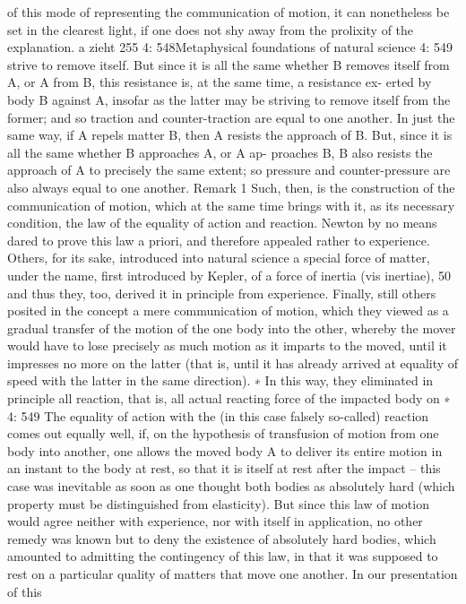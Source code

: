 of this mode of representing the communication of motion, it can nonetheless
be set in the clearest light, if one does not shy away from the prolixity of the
explanation.
a
zieht
255
4: 548Metaphysical foundations of natural science
4: 549
strive to remove itself. But since it is all the same whether B removes itself
from A, or A from B, this resistance is, at the same time, a resistance ex-
erted by body B against A, insofar as the latter may be striving to remove
itself from the former; and so traction and counter-traction are equal to
one another. In just the same way, if A repels matter B, then A resists the
approach of B. But, since it is all the same whether B approaches A, or A ap-
proaches B, B also resists the approach of A to precisely the same extent;
so pressure and counter-pressure are also always equal to one another.
Remark 1
Such, then, is the construction of the communication of motion, which
at the same time brings with it, as its necessary condition, the law of
the equality of action and reaction. Newton by no means dared to prove
this law a priori, and therefore appealed rather to experience. Others, for
its sake, introduced into natural science a special force of matter, under
the name, ﬁrst introduced by Kepler, of a force of inertia (vis inertiae), 50
and thus they, too, derived it in principle from experience. Finally, still
others posited in the concept a mere communication of motion, which
they viewed as a gradual transfer of the motion of the one body into
the other, whereby the mover would have to lose precisely as much
motion as it imparts to the moved, until it impresses no more on the
latter (that is, until it has already arrived at equality of speed with the
latter in the same direction). ∗ In this way, they eliminated in principle
all reaction, that is, all actual reacting force of the impacted body on
∗
4: 549
The equality of action with the (in this case falsely so-called) reaction comes out
equally well, if, on the hypothesis of transfusion of motion from one body into
another, one allows the moved body A to deliver its entire motion in an instant
to the body at rest, so that it is itself at rest after the impact – this case was
inevitable as soon as one thought both bodies as absolutely hard (which property
must be distinguished from elasticity). But since this law of motion would
agree neither with experience, nor with itself in application, no other remedy
was known but to deny the existence of absolutely hard bodies, which amounted
to admitting the contingency of this law, in that it was supposed to rest on a
particular quality of matters that move one another. In our presentation of this
